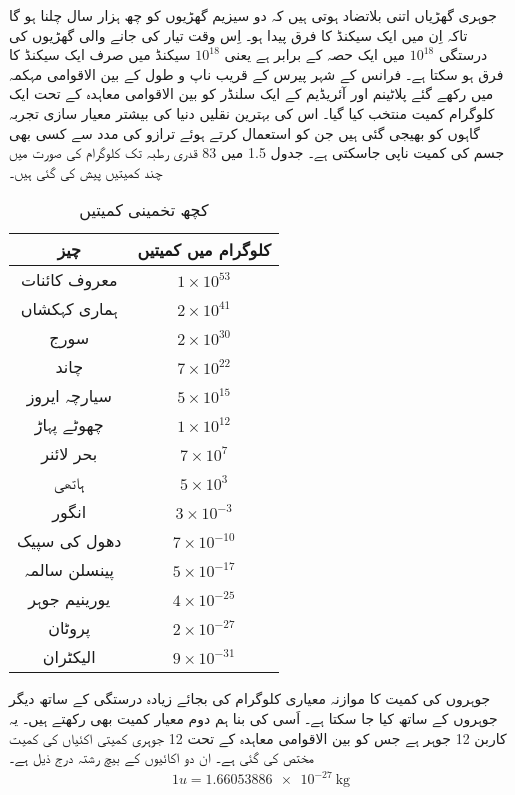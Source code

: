 جوہری گھڑیاں اتنی بلاتضاد ہوتی ہیں کہ دو سیزیم گھڑیوں کو چھ ہزار سال چلنا ہو گا تاکہ اِن میں ایک سیکنڈ کا فرق پیدا ہو۔ اِس وقت تیار کی جانے والی گھڑیوں کی درستگی $10^{18}$ میں ایک حصہ کے برابر ہے یعنی $10^{18}$ سیکنڈ میں صرف ایک سیکنڈ کا فرق ہو سکتا ہے۔
فرانس کے شہر پیرس کے قریب ناپ و طول کے بین الاقوامی مہکمہ میں رکھے گئے پلاٹینم اور آئریڈیم کے ایک سلنڈر کو بین الاقوامی معاہدہ کے تحت ایک کلوگرام کمیت منتخب کیا گیا۔ اس کی بہترین نقلیں دنیا کی بیشتر معیار سازی تجربہ گاہوں کو بھیجی گئی ہیں جن کو استعمال کرتے ہوئے ترازو کی مدد سے کسی بھی جسم کی کمیت ناپی جاسکتی ہے۔ جدول 1.5 میں 83 قدری رطبہ تک کلوگرام کی صورت میں  چند کمیتیں پیش کی گئی ہیں۔
\begin{table}[h!]
	\centering
	\begin{tabular}{|c c|}
		\hline
		چیز & کلوگرام میں کمیتیں\\
		\hline\hline
		معروف کائنات & $1\times 10^{53}$\\
		\hline
		ہماری کہکشاں & $2\times 10^{41}$\\
		\hline
		سورج & $2\times 10^{30}$\\
		\hline
		چاند & $7\times 10^{22}$\\
		\hline
		سیارچہ ایروز & $5\times 10^{15}$\\
		\hline
		چھوٹے پہاڑ & $1\times 10^{12}$\\
		\hline
		بحر لائنر & $7\times10^{7}$\\
		\hline
		ہاتھی & $5\times10^{3}$\\
		\hline
		انگور & $3\times10^{-3}$\\
		\hline
		دھول کی سپیک & $7\times10^{-10}$\\
		\hline
		پینسلن سالمہ & $5\times10^{-17}$\\
		\hline
		یورینیم جوہر & $4\times10^{-25}$\\
		\hline
		 پروٹان & $2\times10^{-27}$\\
		 \hline
		 الیکٹران & $9\times10^{-31}$\\
		 \hline
	\end{tabular}
\caption{کچھ تخمینی کمیتیں}
\label{tab:my_label}
\end{table}
جوہروں کی کمیت کا موازنہ معیاری کلوگرام کی بجائے زیادہ درستگی کے ساتھ دیگر جوہروں کے ساتھ کیا جا سکتا ہے۔ اَسی کی بنا ہم دوم معیار کمیت بھی رکھتے ہیں۔ یہ کاربن 12 جوہر ہے جس کو بین الاقوامی معاہدہ کے تحت 12 جوہری کمیتی اکئیاں کی کمیت مختص کی گئی ہے۔ ان دو اکائیوں کے بیچ رشتہ درج ذیل ہے۔
\begin{align}
	\num{1} u = \SI{1.66053886e-27}{\kilogram}
\end{align}

